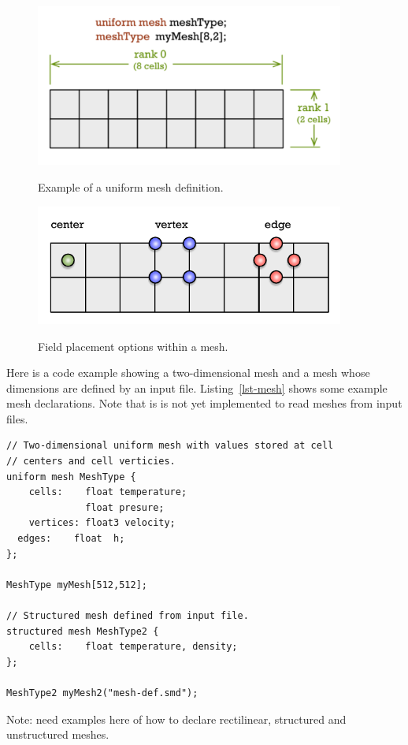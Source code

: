 \par\bigskip
\begin{figure}[h]
  \centering
  \includegraphics[width=4.0in]{datatypes/figures/mesh-def.pdf} \\
  \caption{Example of a uniform mesh definition.}
  \label{fig:types:mesh-def}
\end{figure}



\begin{figure}[h]
  \centering
  \includegraphics[width=4.0in]{datatypes/figures/grid-positions.pdf} \\
  \caption{Field placement options within a mesh.}
  \label{fig:types:grid-positions}
\end{figure}
\par\bigskip\noindent

Here is a code example showing a two-dimensional mesh and a mesh
whose dimensions are defined by an input file.
Listing~\ref{lst-mesh} shows some example mesh declarations.
Note that is is not yet implemented to read meshes from input files.

\par\bigskip
\begin{lstlisting}[float=h,label=lst-mesh,
    caption={Mesh declarations.}]
// Two-dimensional uniform mesh with values stored at cell 
// centers and cell verticies. 
uniform mesh MeshType {
	cells:    float temperature;
	          float presure;
	vertices: float3 velocity;
  edges:    float  h;
};

MeshType myMesh[512,512];

// Structured mesh defined from input file. 
structured mesh MeshType2 {
	cells:    float temperature, density;
};

MeshType2 myMesh2("mesh-def.smd");
\end{lstlisting}
\par\bigskip\noindent

Note: need examples here of how to declare rectilinear, structured and unstructured meshes.
